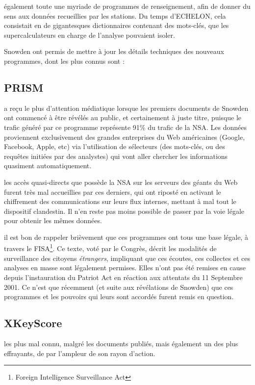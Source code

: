  également toute une myriade de programmes de
renseignement, afin de donner du sens aux données recueillies par les stations.
Du temps d'ECHELON, cela consistait en de gigantesques dictionnaires contenant
des mots-clés, que les supercalculateurs en charge de l'analyse pouvaient
isoler.

 Snowden ont permis de mettre à jour les détails
techniques des nouveaux programmes, dont les plus connus sont :

\subsection{PRISM}
 a reçu le plus d'attention médiatique
lorsque les premiers documents de Snowden ont commencé à être révélés au public,
et certainement à juste titre, puisque le trafic généré par ce programme
représente 91\% du trafic de la NSA\cite{WP91}. Les données proviennent
exclusivement des grandes entreprises du Web américaines (Google, Facebook,
Apple, etc) via l'utilisation de sélecteurs (des mots-clés, ou des requêtes
initiées par des analystes) qui vont aller chercher les informations quasiment
automatiquement.

 les accès quasi-directs que possède la NSA sur
les serveurs des géants du Web furent très mal accueillies par ces derniers, qui
ont riposté en activant le chiffrement des communications sur leurs flux
internes\cite{WPGoogle}, mettant à mal tout le dispositif clandestin. Il n'en
reste pas moins possible de passer par la voie légale pour obtenir les mêmes
données.

 il est bon de rappeler brièvement que ces programmes ont
tous une base légale, à travers le FISA\footnote{Foreign Intelligence
Surveillance Act}. Ce texte, voté par le Congrès, décrit les modalités de
surveillance des citoyens \emph{étrangers}, impliquant que ces écoutes, ces
collectes et ces analyses en masse sont légalement permises. Elles n'ont pas
été remises en cause depuis l'instauration du Patriot Act en réaction aux attentats du 11 Septembre 2001.
Ce n'est que récemment (et suite aux révélations de Snowden) que ces programmes
et les pouvoirs qui leurs sont accordés furent remis en question.

\subsection{XKeyScore}
 les plus mal connu, malgré les
documents publiés, mais également un des plus effrayants, de par l'ampleur de
son rayon d'action. 

